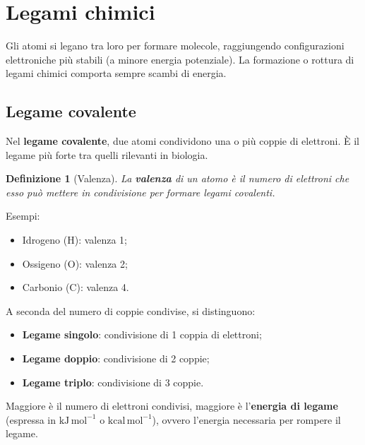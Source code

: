 \documentclass[12pt,a4paper]{report}
\newtheorem{definizione}{Definizione}[section]
\begin{document}
\section{Legami chimici}
Gli atomi si legano tra loro per formare molecole, raggiungendo configurazioni elettroniche più stabili (a minore energia potenziale). La formazione o rottura di legami chimici comporta sempre scambi di energia.
\subsection{Legame covalente}
Nel \textbf{legame covalente}, due atomi condividono una o più coppie di elettroni. È il legame più forte tra quelli rilevanti in biologia.
\begin{definizione}[Valenza]
La \textbf{valenza} di un atomo è il numero di elettroni che esso può mettere in condivisione per formare legami covalenti.
\end{definizione}
Esempi:
\begin{itemize}
\item Idrogeno (\(\mathrm{H}\)): valenza 1;
\item Ossigeno (\(\mathrm{O}\)): valenza 2;
\item Carbonio (\(\mathrm{C}\)): valenza 4.
\end{itemize}
A seconda del numero di coppie condivise, si distinguono:
\begin{itemize}
\item \textbf{Legame singolo}: condivisione di 1 coppia di elettroni;
\item \textbf{Legame doppio}: condivisione di 2 coppie;
\item \textbf{Legame triplo}: condivisione di 3 coppie.
\end{itemize}
Maggiore è il numero di elettroni condivisi, maggiore è l'\textbf{energia di legame} (espressa in \(\mathrm{kJ\,mol^{-1}}\) o \(\mathrm{kcal\,mol^{-1}}\)), ovvero l'energia necessaria per rompere il legame.
\end{document}
